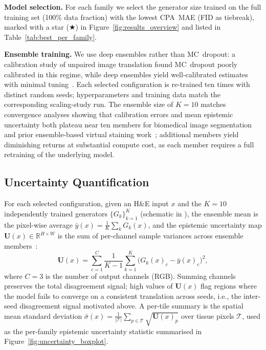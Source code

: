 \noindent\textbf{Model selection.}
For each family we select the generator size trained on the full training set (100\%
data fraction) with the lowest CPA~MAE (FID as tiebreak), marked with a star
($\bigstar$) in Figure~\ref{fig:results_overview} and listed in
Table~\ref{tab:best_per_family}.

\noindent\textbf{Ensemble training.}
We use deep ensembles rather than MC~dropout: a calibration study of unpaired image
translation found MC~dropout poorly calibrated in this regime, while deep ensembles
yield well-calibrated estimates with minimal
tuning~\cite{trustworthy_i2i2025, lakshminarayanan2017simple}.
Each selected configuration is re-trained ten times with distinct random seeds;
hyperparameters and training data match the corresponding scaling-study run.
The ensemble size of $K{=}10$ matches convergence analyses showing that calibration
errors and mean epistemic uncertainty both plateau near ten members for biomedical image
segmentation~\cite{siddiqui2024uncertainty} and prior ensemble-based virtual staining
work~\cite{insilicolabeling2023}; additional members yield diminishing returns
at substantial compute cost, as each member requires a full retraining of the
underlying model.

\subsection{Uncertainty Quantification}
\label{sec:uncertainty_quantification}

For each selected configuration, given an H\&E input $x$ and the $K{=}10$
independently trained generators $\{G_k\}_{k=1}^{K}$ (schematic in ), the ensemble mean is the pixel-wise average
$\bar{y}(x) = \frac{1}{K}\sum_{k} G_k(x)$, and the epistemic uncertainty map
$\mathbf{U}(x) \in \mathbb{R}^{H \times W}$ is the sum of per-channel sample variances
across ensemble members~\cite{lakshminarayanan2017simple}:
\begin{equation}
  \mathbf{U}(x) = \sum_{c=1}^{C} \frac{1}{K-1}
  \sum_{k=1}^{K} \bigl(G_k(x)_{c} - \bar{y}(x)_{c}\bigr)^{2},
  \label{eq:uncertainty}
\end{equation}
where $C{=}3$ is the number of output channels (RGB).
Summing channels preserves the total disagreement signal; high values of
$\mathbf{U}(x)$ flag regions where the model fails to converge on a consistent
translation across seeds, i.e., the inter-seed disagreement signal motivated above.
A per-tile summary is the spatial mean standard deviation
$\bar{\sigma}(x) = \frac{1}{|\mathcal{T}|}\sum_{p \in \mathcal{T}} \sqrt{\mathbf{U}(x)_p}$
over tissue pixels $\mathcal{T}$, used as the per-family epistemic uncertainty
statistic summarised in Figure~\ref{fig:uncertainty_boxplot}.

